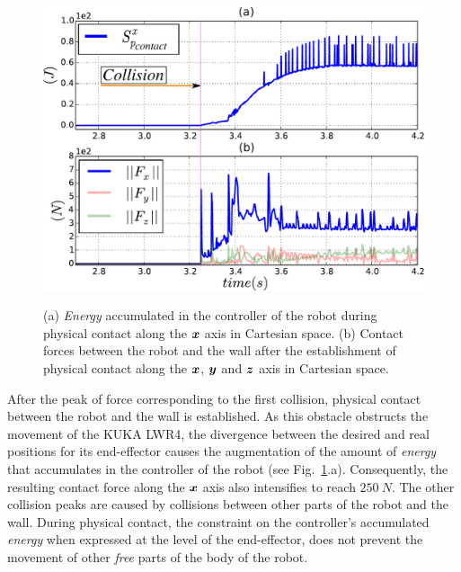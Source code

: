\documentclass[letterpaper, 10 pt, conference]{ieeeconf}      %
\newcommand{\vect}[1]{\mbox{\boldmath${#1}$}}%
\begin{document}
\begin{figure}[!htbp]
\centering
{\includegraphics[width=0.95\columnwidth]{figures/ep__f_tau_!!!!}}
\caption{(a) \textit{Energy} accumulated in the controller of the robot during physical contact along the $\vect{x}$ axis in Cartesian space. (b) Contact forces between the robot and the wall after the establishment of physical contact along the $\vect{x}$, $\vect{y}$ and $\vect{z}$ axis in Cartesian space.} 
\label{fig:ep__f_tau_!!!!}
\end{figure}
After the peak of force corresponding to the first collision, physical contact between the robot and the wall is established. As this obstacle obstructs the movement of the KUKA LWR4, the divergence between the desired and real positions for its end-effector causes the augmentation of the amount of \textit{energy} that accumulates in the controller of the robot (see Fig.~\ref{fig:ep__f_tau_!!!!}.a). Consequently, the resulting contact force along the $\vect{x}$ axis also intensifies to reach $250~N$. The other collision peaks are caused by collisions between other parts of the robot and the wall. During physical contact, the constraint on the controller's accumulated \textit{energy} when expressed at the level of the end-effector, does not prevent the movement of other \textit{free} parts of the body of the robot. \\
\end{document}
